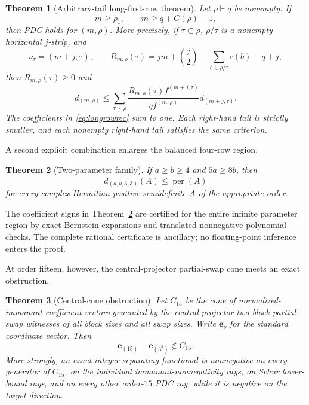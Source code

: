 \documentclass[11pt]{article}
\newtheorem{theorem}{Theorem}[section]
\theoremstyle{definition}
\newcommand{\per}{\operatorname{per}}
\newcommand{\dbar}{\overline d}
\begin{document}
\begin{theorem}[Arbitrary-tail long-first-row theorem]\label{thm:longrow}
Let $\rho\vdash q$ be nonempty.  If
\[
 m\ge \rho_1,\qquad m\ge q+C(\rho)-1,
\]
then PDC holds for $(m,\rho)$.  More precisely, if $\tau\subset\rho$, $\rho/\tau$ is a nonempty horizontal $j$-strip, and
\[
 \nu_\tau=(m+j,\tau),\qquad
 R_{m,\rho}(\tau)=jm+\binom j2-\sum_{b\in\rho/\tau}c(b)-q+j,
\]
then $R_{m,\rho}(\tau)\ge0$ and
\begin{equation}\label{eq:longrowrec}
 \dbar_{(m,\rho)}\le
 \sum_{\tau\ne\rho}
 \frac{R_{m,\rho}(\tau)f^{(m+j,\tau)}}{qf^{(m,\rho)}}
 \dbar_{(m+j,\tau)}.
\end{equation}
The coefficients in \eqref{eq:longrowrec} sum to one.  Each right-hand tail is strictly smaller, and each nonempty right-hand tail satisfies the same criterion.
\end{theorem}

A second explicit combination enlarges the balanced four-row region.

\begin{theorem}[Two-parameter family]\label{thm:ab33}
If $a\ge b\ge4$ and $5a\ge8b$, then
\[
 \dbar_{(a,b,3,3)}(A)\le \per(A)
\]
for every complex Hermitian positive-semidefinite $A$ of the appropriate order.
\end{theorem}

The coefficient signs in Theorem~\ref{thm:ab33} are certified for the entire infinite parameter region by exact Bernstein expansions and translated nonnegative polynomial checks.  The complete rational certificate is ancillary; no floating-point inference enters the proof.

At order fifteen, however, the central-projector partial-swap cone meets an exact obstruction.

\begin{theorem}[Central-cone obstruction]\label{thm:separator}
Let $C_{15}$ be the cone of normalized-immanant coefficient vectors generated by the central-projector two-block partial-swap witnesses of all block sizes and all swap sizes.  Write $\mathbf e_\nu$ for the standard coordinate vector.  Then
\[
 \mathbf e_{(15)}-\mathbf e_{(3^5)}\notin C_{15}.
\]
More strongly, an exact integer separating functional is nonnegative on every generator of $C_{15}$, on the individual immanant-nonnegativity rays, on Schur lower-bound rays, and on every other order-$15$ PDC ray, while it is negative on the target direction.
\end{theorem}
\end{document}
